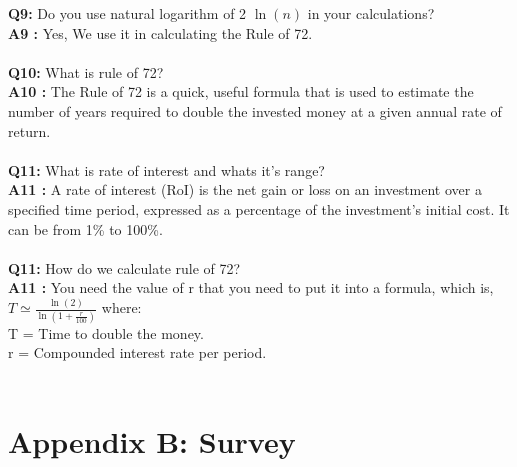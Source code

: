 \documentclass{article}
\begin{document}
\textbf{Q9: } Do you use natural logarithm of 2 $\ln(n)$ in your calculations? \\
\textbf{A9 : } Yes, We use it in calculating the Rule of 72. \\ \\
\textbf{Q10: } What is rule of 72? \\
\textbf{A10 : } The Rule of 72 is a quick, useful formula that is used to estimate the number of years required to double the invested money at a given annual rate of return. \\ \\
\textbf{Q11: } What is rate of interest and whats it's range? \\
\textbf{A11 : } A rate of interest (RoI) is the net gain or loss on an investment over a specified time period, expressed as a percentage of the investment’s initial cost. It can be from 1\% to 100\%. \\ \\
\textbf{Q11: } How do we calculate rule of 72? \\
\textbf{A11 : } You need the value of r that you need to put it into a formula, which is, \\
$T \simeq \frac{\ln(2)}{\ln(1+\frac{r}{100})}$
    where: \\
    T = Time to double the money. \\
    r = Compounded interest rate per period. \\ \\



\newpage
\section{Appendix B: Survey}
\end{document}
